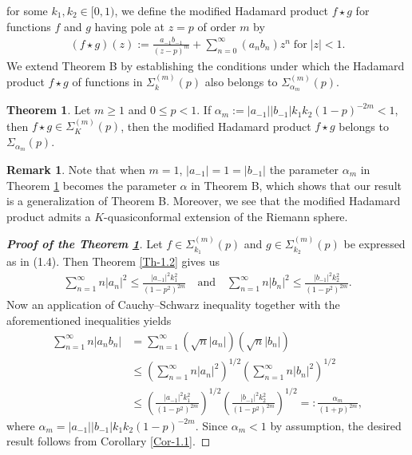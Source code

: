 \documentclass[a4paper,12pt]{amsart}
\theoremstyle{plain}
\theoremstyle{definition}
\newtheorem{thm}{Theorem}[section]
\newtheorem{rem}{Remark}[section]
\begin{document}
for some $k_1,k_2\in[0,1)$, we define the modified Hadamard product $f\star g$ for functions $f$ and $g$ having pole at $z=p$ of order $m$ by
\begin{align*}
	(f\star g)(z):=\frac{a_{-1}b_{-1}}{(z-p)^{m}}+\sum_{n=0}^\infty (a_n b_n)z^n\; \mbox{for}\;|z|<1.
\end{align*}
We extend Theorem B by establishing the conditions under which the Hadamard product $f \star g$ of functions in $\Sigma^{(m)}_{k}(p)$ also belongs to $\Sigma^{(m)}_{\alpha_m}(p)$.
\begin{thm}\label{TH-1.2}
	Let $m\geq 1$ and $0\leq p<1$. 
	If $\alpha_m:=|a_{-1}||b_{-1}|{k_1k_2}{(1-p)^{-2m}}<1$, then $f\star g \in \Sigma^{(m)}_{K}(p)$, then the modified Hadamard product $f \star g$ belongs to $\Sigma_{\alpha_m}(p)$.  
\end{thm}
\begin{rem}
	Note that when $m=1$, $|a_{-1}|=1=|b_{-1}|$ the parameter $\alpha_m$ in Theorem \ref{TH-1.2} becomes the parameter $\alpha$ in Theorem B, which shows that our result is a generalization of Theorem B. Moreover, we see that the modified Hadamard product admits a $K$-quasiconformal extension of the Riemann sphere.
\end{rem}
\begin{proof}[\bf Proof of the Theorem \ref{TH-1.2}]
	Let $f \in \Sigma^{(m)}_{k_1}(p)$ and $g \in \Sigma^{(m)}_{k_2}(p)$ be expressed as in (1.4).
	Then Theorem \ref{Th-1.2} gives us
\begin{align*}
	\sum_{n=1}^{\infty} n |a_n|^2 \leq \frac{|a_{-1}|^2k_1^2}{(1-p^2)^{2m}}
	\quad \text{and} \quad
	\sum_{n=1}^{\infty} n |b_n|^2 \leq \frac{|b_{-1}|^2k_2^2}{(1-p^2)^{2m}}.
\end{align*}
	Now an application of Cauchy--Schwarz inequality together with the aforementioned
	inequalities yields
	\begin{align*}
		\sum_{n=1}^{\infty} n |a_n b_n|
		&= \sum_{n=1}^{\infty} (\sqrt{n}|a_n|)(\sqrt{n}|b_n|)\\&\leq \left( \sum_{n=1}^{\infty} n|a_n|^2 \right)^{1/2}
		\left( \sum_{n=1}^{\infty} n|b_n|^2 \right)^{1/2}\\&\leq \left(\frac{|a_{-1}|^2k_1^2}{(1-p^2)^{2m}}\right)^{1/2}\left(\frac{|b_{-1}|^2k_2^2}{(1-p^2)^{2m}}\right)^{1/2}
		=: \frac{\alpha_m}{(1+p)^{2m}},
	\end{align*}
	where $\alpha_m = |a_{-1}||b_{-1}|k_1 k_2 (1-p)^{-2m}$. Since $\alpha_m < 1$ by assumption, the desired
	result follows from Corollary \ref{Cor-1.1}.
\end{proof}
\end{document}
